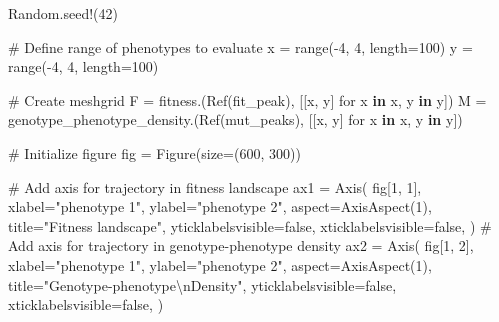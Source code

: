 \documentclass[
]{scrartcl}
\newenvironment{Shaded}{\begin{snugshade}}{\end{snugshade}}
\newcommand{\BuiltInTok}[1]{\textcolor[rgb]{0.00,0.23,0.31}{#1}}
\newcommand{\CommentTok}[1]{\textcolor[rgb]{0.37,0.37,0.37}{#1}}
\newcommand{\ConstantTok}[1]{\textcolor[rgb]{0.56,0.35,0.01}{#1}}
\newcommand{\FloatTok}[1]{\textcolor[rgb]{0.68,0.00,0.00}{#1}}
\newcommand{\FunctionTok}[1]{\textcolor[rgb]{0.28,0.35,0.67}{#1}}
\newcommand{\KeywordTok}[1]{\textcolor[rgb]{0.00,0.23,0.31}{\textbf{#1}}}
\newcommand{\NormalTok}[1]{\textcolor[rgb]{0.00,0.23,0.31}{#1}}
\newcommand{\OperatorTok}[1]{\textcolor[rgb]{0.37,0.37,0.37}{#1}}
\newcommand{\SpecialCharTok}[1]{\textcolor[rgb]{0.37,0.37,0.37}{#1}}
\newcommand{\StringTok}[1]{\textcolor[rgb]{0.13,0.47,0.30}{#1}}
\begin{document}
\begin{Shaded}
\begin{Highlighting}[]
\BuiltInTok{Random}\NormalTok{.}\FunctionTok{seed!}\NormalTok{(}\FloatTok{42}\NormalTok{)}

\CommentTok{\# Define range of phenotypes to evaluate}
\NormalTok{x }\OperatorTok{=} \FunctionTok{range}\NormalTok{(}\OperatorTok{{-}}\FloatTok{4}\NormalTok{, }\FloatTok{4}\NormalTok{, length}\OperatorTok{=}\FloatTok{100}\NormalTok{)}
\NormalTok{y }\OperatorTok{=} \FunctionTok{range}\NormalTok{(}\OperatorTok{{-}}\FloatTok{4}\NormalTok{, }\FloatTok{4}\NormalTok{, length}\OperatorTok{=}\FloatTok{100}\NormalTok{)}

\CommentTok{\# Create meshgrid}
\NormalTok{F }\OperatorTok{=} \FunctionTok{fitness}\NormalTok{.(}\FunctionTok{Ref}\NormalTok{(fit\_peak), [[x, y] for x }\KeywordTok{in}\NormalTok{ x, y }\KeywordTok{in}\NormalTok{ y])}
\NormalTok{M }\OperatorTok{=} \FunctionTok{genotype\_phenotype\_density}\NormalTok{.(}\FunctionTok{Ref}\NormalTok{(mut\_peaks), [[x, y] for x }\KeywordTok{in}\NormalTok{ x, y }\KeywordTok{in}\NormalTok{ y])}

\CommentTok{\# Initialize figure}
\NormalTok{fig }\OperatorTok{=} \FunctionTok{Figure}\NormalTok{(size}\OperatorTok{=}\NormalTok{(}\FloatTok{600}\NormalTok{, }\FloatTok{300}\NormalTok{))}

\CommentTok{\# Add axis for trajectory in fitness landscape}
\NormalTok{ax1 }\OperatorTok{=} \FunctionTok{Axis}\NormalTok{(}
\NormalTok{    fig[}\FloatTok{1}\NormalTok{, }\FloatTok{1}\NormalTok{],}
\NormalTok{    xlabel}\OperatorTok{=}\StringTok{"phenotype 1"}\NormalTok{,}
\NormalTok{    ylabel}\OperatorTok{=}\StringTok{"phenotype 2"}\NormalTok{,}
\NormalTok{    aspect}\OperatorTok{=}\FunctionTok{AxisAspect}\NormalTok{(}\FloatTok{1}\NormalTok{),}
\NormalTok{    title}\OperatorTok{=}\StringTok{"Fitness landscape"}\NormalTok{,}
\NormalTok{    yticklabelsvisible}\OperatorTok{=}\ConstantTok{false}\NormalTok{,}
\NormalTok{    xticklabelsvisible}\OperatorTok{=}\ConstantTok{false}\NormalTok{,}
\NormalTok{)}
\CommentTok{\# Add axis for trajectory in genotype{-}phenotype density}
\NormalTok{ax2 }\OperatorTok{=} \FunctionTok{Axis}\NormalTok{(}
\NormalTok{    fig[}\FloatTok{1}\NormalTok{, }\FloatTok{2}\NormalTok{],}
\NormalTok{    xlabel}\OperatorTok{=}\StringTok{"phenotype 1"}\NormalTok{,}
\NormalTok{    ylabel}\OperatorTok{=}\StringTok{"phenotype 2"}\NormalTok{,}
\NormalTok{    aspect}\OperatorTok{=}\FunctionTok{AxisAspect}\NormalTok{(}\FloatTok{1}\NormalTok{),}
\NormalTok{    title}\OperatorTok{=}\StringTok{"Genotype{-}phenotype}\SpecialCharTok{\textbackslash{}n}\StringTok{Density"}\NormalTok{,}
\NormalTok{    yticklabelsvisible}\OperatorTok{=}\ConstantTok{false}\NormalTok{,}
\NormalTok{    xticklabelsvisible}\OperatorTok{=}\ConstantTok{false}\NormalTok{,}
\NormalTok{)}


\end{Highlighting}
\end{Shaded}
\end{document}
